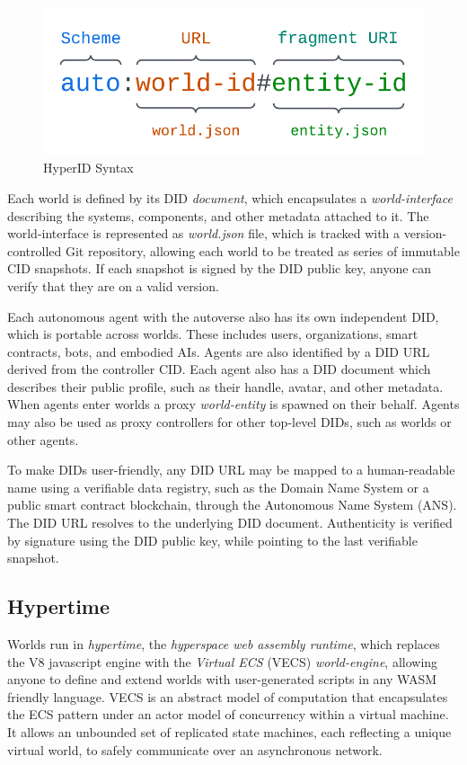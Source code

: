 \documentclass[twocolumn, 10pt]{article}
\begin{document}
\begin{figure}
    \centering
    \includegraphics[width=\columnwidth]{images/hyperid.png}
    \caption{HyperID Syntax}
    \label{fig:my_label}
\end{figure}

Each world is defined by its DID \textit{document}, which encapsulates a \textit{world-interface} describing the systems, components, and other metadata attached to it. The world-interface is represented as \textit{world.json} file, which is tracked with a version-controlled Git repository, allowing each world to be treated as series of immutable CID snapshots. If each snapshot is signed by the DID public key, anyone can verify that they are on a valid version. 

Each autonomous agent with the autoverse also has its own independent DID, which is portable across worlds. These includes users, organizations, smart contracts, bots, and embodied AIs. Agents are also identified by a DID URL derived from the controller CID. Each agent also has a DID document which describes their public profile, such as their handle, avatar, and other metadata. When agents enter worlds a proxy \textit{world-entity} is spawned on their behalf. Agents may also be used as proxy controllers for other top-level DIDs, such as worlds or other agents. 

To make DIDs user-friendly, any DID URL may be mapped to a human-readable name using a verifiable data registry, such as the Domain Name System or a public smart contract blockchain, through the Autonomous Name System (ANS). The DID URL resolves to the underlying DID document. Authenticity is verified by signature using the DID public key, while pointing to the last verifiable snapshot.

\subsection{Hypertime}

Worlds run in \textit{hypertime}, the \textit{hyperspace web assembly runtime}, which replaces the V8 javascript engine with the \textit{Virtual ECS} (VECS) \textit{world-engine}, allowing anyone to define and extend worlds with user-generated scripts in any WASM friendly language. VECS is an abstract model of computation that encapsulates the ECS pattern under an actor model of concurrency within a virtual machine. It allows an unbounded set of replicated state machines, each reflecting a unique virtual world, to safely communicate over an asynchronous network. 
\end{document}
